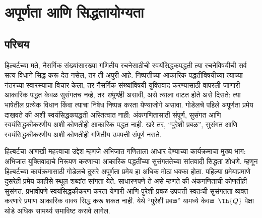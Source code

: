 \chapter{अपूर्णता आणि सिद्धतायोग्यता}\label{inc:inp:chap}









\section{परिचय}\label{inc:inp:int:sec}

हिल्बर्टच्या मते, नैसर्गिक संख्यांसारख्या गणितीय रचनेसाठीची
स्वयंसिद्धकपद्धती त्या रचनेविषयीची सर्व सत्य विधाने सिद्ध करू देत
नसेल, तर ती अपुरी आहे. निष्पत्तीच्या आकारिक पद्धतींविषयीच्या
त्याच्या नंतरच्या स्वारस्याचा विचार केला, तर नैसर्गिक संख्यांविषयी
युक्तिवाद करण्यासाठी वापरली जाणारी आकारिक पद्धत केवळ सुसंगतच
नव्हे, तर \emph{संपूर्ण}ही असावी, असे त्याला वाटत होते असे दिसते:
त्या भाषेतील प्रत्येक विधान किंवा त्याचा निषेध निष्पन्न करता येण्याजोगे
असावा. गोडेलचे पहिले अपूर्णता प्रमेय दाखवते की अशी
स्वयंसिद्धकपद्धती अस्तित्वात नाही: अंकगणितासाठी संपूर्ण, सुसंगत
आणि स्वयंसिद्धकीकरणीय अशी कोणतीही आकारिक पद्धत नाही. खरे तर,
“पुरेशी प्रबळ”, सुसंगत आणि स्वयंसिद्धकीकरणीय अशी कोणतीही
गणितीय उपपत्ती संपूर्ण नसते.

हिल्बर्टचा आणखी महत्त्वाचा उद्देश म्हणजे अभिजात गणिताला आधार
देण्याच्या कार्यक्रमाचा मुख्य भाग: अभिजात युक्तिवादाचे निरूपण
करणाऱ्या आकारिक पद्धतींच्या सुसंगततेच्या सांतवादी सिद्धता
शोधणे. म्हणून हिल्बर्टच्या कार्यक्रमासाठी गोडेलचे दुसरे
अपूर्णता प्रमेय हा अधिक मोठा धक्का होता. पहिल्या प्रमेयाप्रमाणे
दुसरेही प्रमेय काहीसे स्थूल शब्दांत सांगता येते. साधारणपणे ते
असे म्हणते की अंकगणिताची कोणतीही सुसंगत, प्रभावीपणे
स्वयंसिद्धकीकरण करता येणारी आणि पुरेशी प्रबळ उपपत्ती स्वतःची
सुसंगतता व्यक्त करणारे प्रमाण आकारिक वाक्य सिद्ध करू शकत नाही. येथे “पुरेशी प्रबळ” यामध्ये
केवळ~$\Th{Q}$ पेक्षा थोडे अधिक सामर्थ्य समाविष्ट करावे लागेल.

